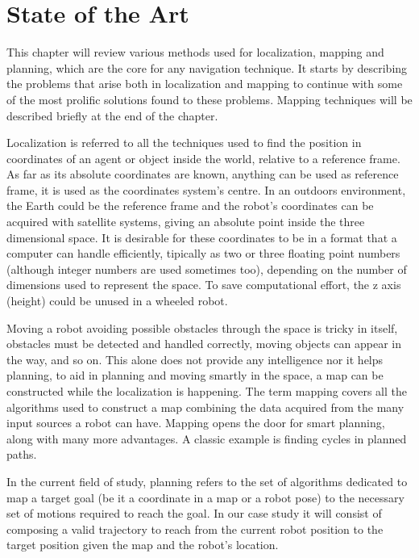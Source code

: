 \chapter{State of the Art}

  This chapter will review various methods used for localization, mapping and planning, which are the core for any navigation technique. It starts by describing the problems that arise both in localization and mapping to continue with some of the most prolific solutions found to these problems. Mapping techniques will be described briefly at the end of the chapter. 

  Localization is referred to all the techniques used to find the position in coordinates of an agent or object inside the world, relative to a reference frame. As far as its absolute coordinates are known, anything can be used as reference frame, it is used as the coordinates system's centre. In an outdoors environment, the Earth could be the reference frame and the robot's coordinates can be acquired with satellite systems, giving an absolute point inside the three dimensional space. It is desirable for these coordinates to be in a format that a computer can handle efficiently, tipically as two or three floating point numbers (although integer numbers are used sometimes too), depending on the number of dimensions used to represent the space. To save computational effort, the z axis (height) could be unused in a wheeled robot.

  Moving a robot avoiding possible obstacles through the space is tricky in itself, obstacles must be detected and handled correctly, moving objects can appear in the way, and so on. This alone does not provide any intelligence nor it helps planning, to aid in planning and moving smartly in the space, a map can be constructed while the localization is happening. The term mapping covers all the algorithms used to construct a map combining the data acquired from the many input sources a robot can have. Mapping opens the door for smart planning, along with many more advantages. A classic example is finding cycles in planned paths.
  
  In the current field of study, planning refers to the set of algorithms dedicated to map a target goal (be it a coordinate in a map or a robot pose) to the necessary set of motions required to reach the goal. In our case study it will consist of composing a valid trajectory to reach from the current robot position to the target position given the map and the robot's location.

